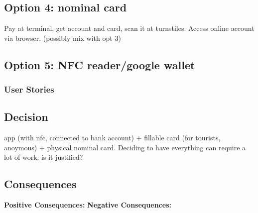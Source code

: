 \subsection*{Option 4: nominal card}
Pay at terminal, get account and card, scan it at turnstiles. Access online account via browser. (possibly mix with opt 3)

\subsection*{Option 5: NFC reader/google wallet}


\subsubsection*{User Stories}
\subsection*{Decision}
app (with nfc, connected to bank account) + fillable card (for tourists, anoymous) + physical nominal card.
Deciding to have everything can require a lot of work: is it justified?
\subsection*{Consequences}
\textbf{Positive Consequences:}
\textbf{Negative Consequences:}
